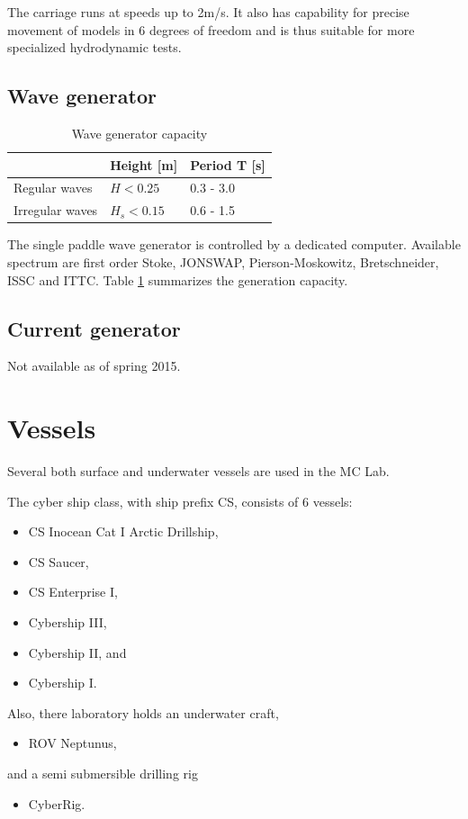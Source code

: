 \documentclass[a4paper,twoside,english]{report}
\providecommand{\tabularnewline}{\\}
\begin{document}
The carriage runs at speeds up to 2m/s. It also has capability for
precise movement of models in 6 degrees of freedom and is thus suitable
for more specialized hydrodynamic tests.

\subsection{Wave generator}

\begin{table}
\centering{}%
\begin{tabular}{lll}
\hline 
 & Height {[}m{]} & Period T {[}s{]}\tabularnewline
\hline 
Regular waves & $H<0.25$ & 0.3 - 3.0\tabularnewline
Irregular waves & \textbf{$H_{s}<0.15$} & 0.6 - 1.5\tabularnewline
\hline 
\end{tabular}\caption{\label{tab:Wave generator capacity-1}Wave generator capacity}
\end{table}

The single paddle wave generator is controlled by a dedicated computer.
Available spectrum are first order Stoke, JONSWAP, Pierson-Moskowitz,
Bretschneider, ISSC and ITTC. Table \ref{tab:Wave generator capacity-1}
summarizes the generation capacity.

\subsection{Current generator}

Not available as of spring 2015.

\clearpage{}

\section{Vessels}

Several both surface and underwater vessels are used in the MC Lab.

The cyber ship class, with ship prefix CS, consists of 6 vessels:
\begin{itemize}
\item CS Inocean Cat I Arctic Drillship,
\item CS Saucer,
\item CS Enterprise I,
\item Cybership III,
\item Cybership II, and
\item Cybership I.
\end{itemize}
Also, there laboratory holds an underwater craft,
\begin{itemize}
\item ROV Neptunus,
\end{itemize}
and a semi submersible drilling rig
\begin{itemize}
\item CyberRig.
\end{itemize}
\clearpage{}
\end{document}
